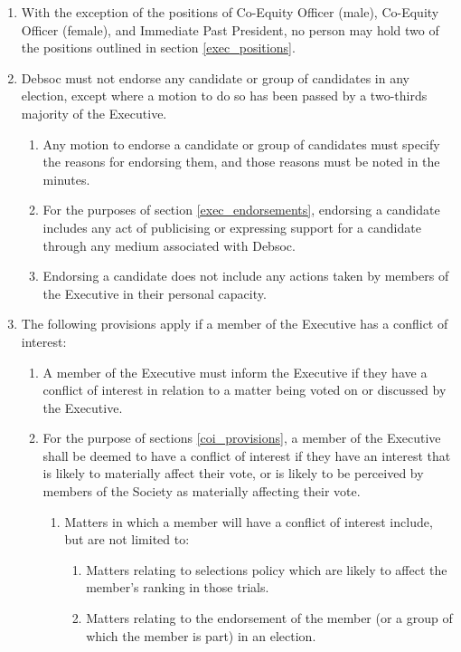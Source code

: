 \begin{enumerate}
\begin{enumerate}
  \end{enumerate}
\item With the exception of the positions of Co-Equity Officer (male), Co-Equity Officer (female), and Immediate Past President, no person may hold two of the positions outlined in section \ref{exec_positions}.
\item Debsoc must not endorse any candidate or group of candidates in any election, except where a motion to do so has been passed by a two-thirds majority of the Executive. \label{exec_endorsements}
  \begin{enumerate}
  \item Any motion to endorse a candidate or group of candidates must specify the reasons for endorsing them, and those reasons must be noted in the minutes.
  \item For the purposes of section \ref{exec_endorsements}, endorsing a candidate includes any act of publicising or expressing support for a candidate through any medium associated with Debsoc.
  \item Endorsing a candidate does not include any actions taken by members of the Executive in their personal capacity.
  \end{enumerate}
\item The following provisions apply if a member of the Executive has a conflict of interest: \label{coi_provisions}
  \begin{enumerate}
  \item A member of the Executive must inform the Executive if they have a conflict of interest in relation to a matter being voted on or discussed by the Executive.
  \item For the purpose of sections \ref{coi_provisions}, a member of the Executive shall be deemed to have a conflict of interest if they have an interest that is likely to materially affect their vote, or is likely to be perceived by members of the Society as materially affecting their vote.
    \begin{enumerate}
    \item Matters in which a member will have a conflict of interest include, but are not limited to:
      \begin{enumerate}
      \item Matters relating to selections policy which are likely to affect the member’s ranking in those trials.
      \item Matters relating to the endorsement of the member (or a group of which the member is part) in an election.

\end{enumerate}
\end{enumerate}
\end{enumerate}
\end{enumerate}
